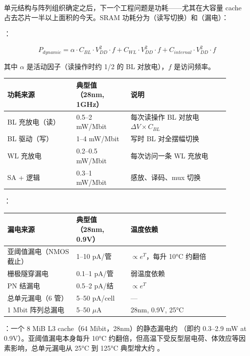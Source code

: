 
单元结构与阵列组织确定之后，下一个工程问题是功耗——尤其在大容量 cache 占去芯片一半以上面积的今天。SRAM 功耗分为（读写切换）和（漏电）：

：

$$P_{dynamic} = \alpha \cdot C_{BL} \cdot V_{DD}^2 \cdot f + C_{WL} \cdot V_{DD}^2 \cdot f + C_{internal} \cdot V_{DD}^2 \cdot f$$

其中 $\alpha$ 是活动因子（读操作时约 1/2 的 BL 对放电），$f$ 是访问频率。

\begin{longtable}{L{0.28\linewidth}L{0.22\linewidth}L{0.40\linewidth}}
\toprule
功耗来源 & 典型值（28nm, 1GHz） & 说明 \\
\midrule
BL 充放电（读） & 0.5--2 mW/Mbit & 每次读操作 BL 对放电 $\Delta V \times C_{BL}$ \\
BL 驱动（写） & 1--4 mW/Mbit & 写时 BL 对全摆幅切换 \\
WL 充放电 & 0.2--0.5 mW/Mbit & 每次访问一条 WL 充放电 \\
SA + 逻辑 & 0.3--1 mW/Mbit & 感放、译码、mux 切换 \\
\bottomrule
\end{longtable}

：

\begin{longtable}{L{0.28\linewidth}L{0.22\linewidth}L{0.40\linewidth}}
\toprule
漏电来源 & 典型值（28nm, 0.9V） & 温度依赖 \\
\midrule
亚阈值漏电（NMOS 截止） & 1--10 pA/管 & $\propto e^{T}$，每升 10°C 约翻倍 \\
栅极隧穿漏电 & 0.1--1 pA/管 & 弱温度依赖 \\
PN 结漏电 & 0.5--2 pA/结 & $\propto e^{T}$ \\
总单元漏电（6 管） & 5--50 pA/cell & — \\
1 Mbit 阵列总漏电 & 5--50 $\mu$A & 28nm, 0.9V, 25°C \\
\bottomrule
\end{longtable}

：一个 8 MiB L3 cache（64 Mibit，28nm）的静态漏电约 （即约 0.3--2.9 mW at 0.9V）。亚阈值漏电本身每升 10°C 约翻倍，但高温下受反型层电荷、体效应等因素影响，总单元漏电从 25°C 到 125°C 典型增大约 。

